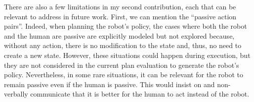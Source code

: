 


There are also a few limitations in my second contribution, each that can be relevant to address in future work.
First, we can mention the ``passive action pairs''. Indeed, when planning the robot's policy, the cases where both the robot and the human are passive are explicitly modeled but not explored because, without any action, there is no modification to the state and, thus, no need to create a new state. However, these situations could happen during execution, but they are not considered in the current plan evaluation to generate the robot's policy. Nevertheless, in some rare situations, it can be relevant for the robot to remain passive even if the human is passive. This would insist on and non-verbally communicate that it is better for the human to act instead of the robot. 

